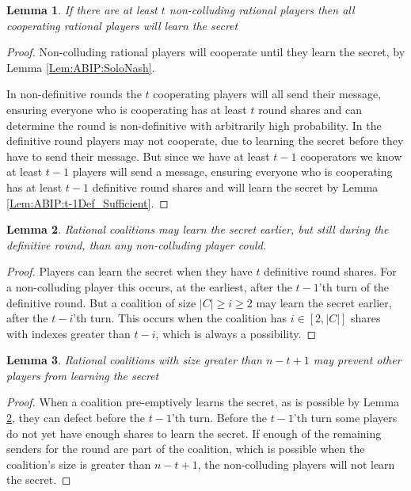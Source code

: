 \documentclass{dalcsthesis}
\newtheorem{lemma}{Lemma}
\begin{document}
\begin{lemma} If there are at least $t$ non-colluding rational players then all cooperating rational players will learn the secret \label{Lem:ABIP:WorksForEnoughSoloRats} \end{lemma}
\begin{proof}
Non-colluding rational players will cooperate until they learn the secret, by Lemma \ref{Lem:ABIP:SoloNash}.

In non-definitive rounds the $t$ cooperating players will all send their message, ensuring everyone who is cooperating has at least $t$ round shares and can determine the round is non-definitive with arbitrarily high probability. In the definitive round players may not cooperate, due to learning the secret before they have to send their message. But since we have at least $t-1$ cooperators we know at least $t-1$ players will send a message, ensuring everyone who is cooperating has at least $t-1$ definitive round shares and will learn the secret by Lemma \ref{Lem:ABIP:t-1Def_Sufficient}. 
\end{proof}

\begin{lemma} Rational coalitions may learn the secret earlier, but still during the definitive round, than any non-colluding player could. \label{Lem:ABIP:Preempt} \end{lemma}
\begin{proof}
Players can learn the secret when they have $t$ definitive round shares. For a non-colluding player this occurs, at the earliest, after the $t-1$'th turn of the definitive round. But a coalition of size $|C| \geq i \geq 2$ may learn the secret earlier, after the $t-i$'th turn. This occurs when the coalition has $i \in [2, |C|]$ shares with indexes greater than $t-i$, which is always a possibility.
\end{proof}

\begin{lemma} Rational coalitions with size greater than $n-t+1$ may prevent other players from learning the secret \label{Lem:ABIP:RatColsCanPrevents} \end{lemma}
\begin{proof}
When a coalition pre-emptively learns the secret, as is possible by Lemma \ref{Lem:ABIP:Preempt}, they can defect before the $t-1$'th turn. Before the $t-1$'th turn some players do not yet have enough shares to learn the secret. If enough of the remaining senders for the round are part of the coalition, which is possible when the coalition's size is greater than $n-t+1$, the non-colluding players will not learn the secret.
\end{proof}
\end{document}
